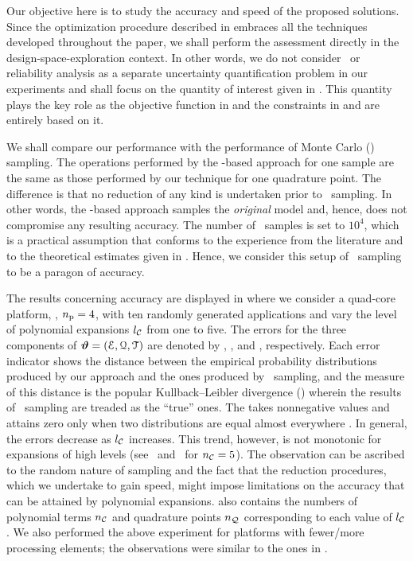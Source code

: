 Our objective here is to study the accuracy and speed of the proposed solutions.
Since the optimization procedure described in  embraces all the techniques developed throughout the paper, we shall perform the assessment directly in the design-space-exploration context.
In other words, we do not consider \ta\ or reliability analysis as a separate uncertainty quantification problem in our experiments and shall focus on the quantity of interest given in .
This quantity plays the key role as the objective function in  and the constraints in  and  are entirely based on it.

We shall compare our performance with the performance of Monte Carlo (\MC) sampling.
The operations performed by the \MC-based approach for one sample are the same as those performed by our technique for one quadrature point.
The difference is that no reduction of any kind is undertaken prior to \MC\ sampling.
In other words, the \MC-based approach samples the \emph{original} model and, hence, does not compromise any resulting accuracy.
The number of \MC\ samples is set to $10^4$, which is a practical assumption that conforms to the experience from the literature \cite{ukhov2014, lee2013, juan2012, xiang2010} and to the theoretical estimates given in \cite{diaz-emparanza2002}.
Hence, we consider this setup of \MC\ sampling to be a paragon of accuracy.


The results concerning accuracy are displayed in  where we consider a quad-core platform, \ie, ${n_\text{p}} = 4$, with ten randomly generated applications and vary the level of polynomial expansions ${l_\mathcal{C}}$ from one to five.
The errors for the three components of $\bm{\vartheta} = (\EuScript{E}, \EuScript{Q}, \EuScript{T})$ are denoted by \errorE, \errorQ, and \errorT, respectively.
Each error indicator shows the distance between the empirical probability distributions produced by our approach and the ones produced by \MC\ sampling, and the measure of this distance is the popular Kullback--Leibler divergence () wherein the results of \MC\ sampling are treaded as the ``true'' ones.
The  takes nonnegative values and attains zero only when two distributions are equal almost everywhere \cite{durrett2010}.
In general, the errors decrease as ${l_\mathcal{C}}$ increases.
This trend, however, is not monotonic for expansions of high levels (see \errorQ\ and \errorT\ for ${n_\mathcal{C}} = 5$).
The observation can be ascribed to the random nature of sampling and the fact that the reduction procedures, which we undertake to gain speed, might impose limitations on the accuracy that can be attained by polynomial expansions.
 also contains the numbers of polynomial terms ${n_\mathcal{C}}$ and quadrature points ${n_\mathcal{Q}}$ corresponding to each value of ${l_\mathcal{C}}$.
We also performed the above experiment for platforms with fewer/more processing elements; the observations were similar to the ones in .

